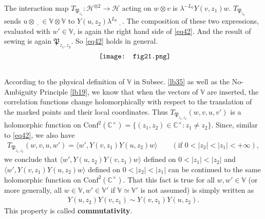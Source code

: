 \documentclass[11pt,b5paper,notitlepage]{article}
\theoremstyle{definition}
\theoremstyle{plain}
\newcommand{\fk}{\mathfrak}
\newcommand{\mc}{\mathcal}
\newcommand{\Conf}{\mathrm{Conf}}
\newcommand{\bk}[1]{\langle {#1}\rangle}
\newcommand{\Vbb}{\mathbb V}
\newcommand{\Cbb}{\mathbb C}
\numberwithin{equation}{section}
\begin{document}
The interaction map $T_{\fk P_{z_1}}:\mc H^{\otimes 2}\rightarrow\mc H$ acting on $w\otimes v$ is $\lambda^{-L_0}Y(v,z_1)w$. $T_{\fk P_{z_2}}$ sends $u\otimes \underline{~~~}\in\Vbb\otimes\Vbb$ to $Y(u,z_2)\lambda^{L_0}\underline{~~~}$. The composition of these two expressions, evaluated with $w'\in\Vbb$, is again the right hand side of \eqref{eq42}. And the result of sewing is again $\fk P_{z_1,z_2}$. So \eqref{eq42} holds in general.
\begin{align*}
	\vcenter{\hbox{{
				\texttt{[image: fig21.png]}}}}
\end{align*}



\subsection{}


According to the physical definition of $\Vbb$ in Subsec. \ref{lb35} as well as the No-Ambiguity Principle \ref{lb19}, we know that when the vectors of $\Vbb$ are inserted, the correlation functions change holomorphically with respect to the translation of the marked points and their local coordinates. Thus $T_{\fk P_{z_1,z_2}}(w,v,u,v')$ is a holomorphic function on $\Conf^2(\Cbb^\times)=\{(z_1,z_2)\in\Cbb^\times:z_1\neq z_2\}$. Since, similar to \eqref{eq42}, we also have
\begin{align}
	T_{\fk P_{z_1,z_2}}(w,v,u,w')=\bk{w',Y(v,z_1)Y(u,z_2)w}\qquad(\text{if }0<|z_2|<|z_1|<+\infty),\label{eq44}	
\end{align}
we conclude that $\bk{w',Y(u,z_2)Y(v,z_1)w}$ defined on $0<|z_1|<|z_2|$ and $\bk{w',Y(v,z_1)Y(u,z_2)w}$ defined on $0<|z_2|<|z_1|$ can be continued to the same holomorphic function on $\Conf^2(\Cbb^\times)$. That this fact is true for all $w,w'\in\Vbb$ (or more generally, all $w\in\Vbb,w'\in\Vbb'$ if $\Vbb\simeq\Vbb'$ is not assumed) is simply written as
\begin{align}
Y(u,z_2)Y(v,z_1)\sim Y(v,z_1)Y(u,z_2).	
\end{align}
This property is called \textbf{commutativity}.
\end{document}
